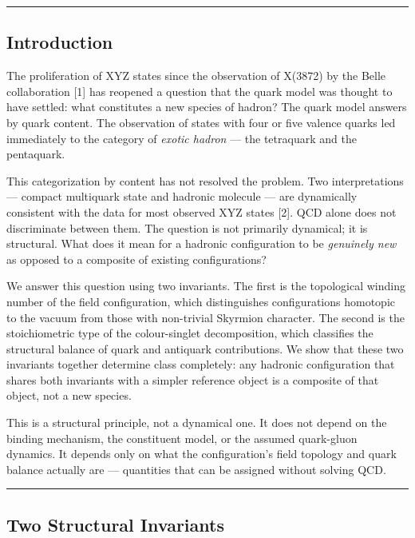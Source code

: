 \documentclass[12pt,a4paper]{article}
\begin{document}
\begin{center}\rule{0.5\linewidth}{0.5pt}\end{center}

\hypertarget{introduction}{%
\subsection{Introduction}\label{introduction}}

The proliferation of XYZ states since the observation of X(3872) by the
Belle collaboration {[}1{]} has reopened a question that the quark model
was thought to have settled: what constitutes a new species of hadron?
The quark model answers by quark content. The observation of states with
four or five valence quarks led immediately to the category of
\emph{exotic hadron} --- the tetraquark and the pentaquark.

This categorization by content has not resolved the problem. Two
interpretations --- compact multiquark state and hadronic molecule ---
are dynamically consistent with the data for most observed XYZ states
{[}2{]}. QCD alone does not discriminate between them. The question is
not primarily dynamical; it is structural. What does it mean for a
hadronic configuration to be \emph{genuinely new} as opposed to a
composite of existing configurations?

We answer this question using two invariants. The first is the
topological winding number of the field configuration, which
distinguishes configurations homotopic to the vacuum from those with
non-trivial Skyrmion character. The second is the stoichiometric type of
the colour-singlet decomposition, which classifies the structural
balance of quark and antiquark contributions. We show that these two
invariants together determine class completely: any hadronic
configuration that shares both invariants with a simpler reference
object is a composite of that object, not a new species.

This is a structural principle, not a dynamical one. It does not depend
on the binding mechanism, the constituent model, or the assumed
quark-gluon dynamics. It depends only on what the configuration's field
topology and quark balance actually are --- quantities that can be
assigned without solving QCD.

\begin{center}\rule{0.5\linewidth}{0.5pt}\end{center}

\hypertarget{two-structural-invariants}{%
\subsection{Two Structural Invariants}\label{two-structural-invariants}}
\end{document}
